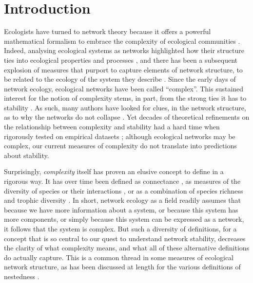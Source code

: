 \section{Introduction}

Ecologists have turned to network theory because it offers a powerful
mathematical formalism to embrace the complexity of ecological communities
\cite{Bascompte2007PlaMut}. Indeed, analysing ecological systems as networks
highlighted how their structure ties into ecological properties and processes
\cite{Proulx2005NetThi, Poulin2010NetAna}, and there has been a subsequent
explosion of measures that purport to capture elements of network structure, to
be related to the ecology of the system they describe \cite{Delmas2018AnaEco}.
Since the early days of network ecology, ecological networks have been called
``complex''. This sustained interest for the notion of complexity stems, in
part, from the strong ties it has to stability \cite{Landi2018ComSta}. As such,
many authors have looked for clues, in the network structure, as to why the
networks do not collapse \cite{Borrelli2015SelIns, Staniczenko2013GhoNes,
Gravel2016StaCom, Brose2006AllSca}. Yet decades of theoretical refinements on
the relationship between complexity and stability had a hard time when
rigorously tested on empirical datasets \cite{Jacquet2016NoCom}; although
ecological networks may be complex, our current measures of complexity do not
translate into predictions about stability.

Surprisingly, \emph{complexity} itself has proven an elusive concept to define
in a rigorous way. It has over time been defined as connectance
\cite{Rozdilsky2001ComCan}, as measures of the diversity of species or their
interactions \cite{Landi2018ComSta}, or as a combination of species richness and
trophic diversity \cite{Duffy2007FunRol}. In short, network ecology as a field
readily assumes that because we have more information about a system, or because
this system has more components, or simply because this system can be expressed
as a network, it follows that the system is complex. But such a diversity of
definitions, for a concept that is so central to our quest to understand network
stability, decreases the clarity of what complexity means, and what all of these
alternative definitions do actually capture. This is a common thread in some
measures of ecological network structure, as has been discussed at length for
the various definitions of nestedness \cite{Ulrich2009ConSG}.

